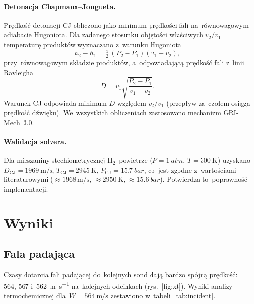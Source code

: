 \documentclass[11pt,a4paper]{article}
\begin{document}
\paragraph{Detonacja Chapmana--Jougueta.}
Prędkość detonacji CJ obliczono jako minimum prędkości fali na~równowagowym
adiabacie Hugoniota. Dla zadanego stosunku objętości właściwych $v_2/v_1$
temperaturę produktów wyznaczano z~warunku Hugoniota
\begin{equation}
h_2-h_1=\tfrac12\,(P_2-P_1)(v_1+v_2),
\end{equation}
przy~równowagowym składzie produktów, a~odpowiadającą prędkość fali z~linii
Rayleigha
\begin{equation}
D=v_1\sqrt{\frac{P_2-P_1}{v_1-v_2}}.
\end{equation}
Warunek CJ odpowiada minimum $D$ względem $v_2/v_1$ (przepływ za~czołem osiąga
prędkość dźwięku). We~wszystkich obliczeniach zastosowano mechanizm
GRI-Mech~3.0.

\paragraph{Walidacja solvera.}
Dla mieszaniny stechiometrycznej $\mathrm{H_2}$--powietrze
($P=\SI{1}{atm}$, $T=\SI{300}{\kelvin}$) uzyskano
$D_{\mathrm{CJ}}=\SI{1969}{\meter\per\second}$,
$T_{\mathrm{CJ}}=\SI{2945}{\kelvin}$, $P_{\mathrm{CJ}}=\SI{15,7}{bar}$,
co~jest zgodne z~wartościami literaturowymi
($\approx\SI{1968}{\meter\per\second}$, $\approx\SI{2950}{\kelvin}$,
$\approx\SI{15,6}{bar}$). Potwierdza to~poprawność implementacji.

\section{Wyniki}

\subsection{Fala padająca}
Czasy dotarcia fali padającej do~kolejnych sond dają bardzo spójną prędkość:
\SI{564}{}, \SI{567}{} i~\SI{562}{\meter\per\second} na~kolejnych odcinkach
(rys.~\ref{fig:xt}). Wyniki analizy termochemicznej dla~$W=\SI{564}{\meter\per\second}$
zestawiono w~tabeli~\ref{tab:incident}.
\end{document}

